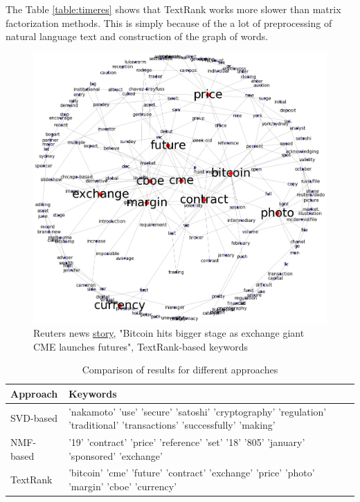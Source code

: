 \documentclass[a4paper]{article}
\begin{document}
The Table \ref{table:timeres} shows that TextRank works more slower than matrix factorization methods. This is simply because of the a lot of preprocessing of natural language text and construction of the graph of words.

\begin{center}
\begin{figure}[h!]
\includegraphics[scale=1]{textrank_example.png}
\caption{Reuters news \href{https://uk.reuters.com/article/us-bitcoin-futures/exchange-giant-cmes-bitcoin-futures-get-tepid-take-up-in-debut-idUKKBN1EB04N}{story}, "Bitcoin hits bigger stage as exchange giant CME launches futures", TextRank-based keywords}
\end{figure}
\end{center}

    \begin{table}[h!]
      \center
      \begin{tabular}{|p{3cm}|p{14cm}|}
      \hline
      Approach & Keywords \\
      \hline
      SVD-based & 'nakamoto' 'use' 'secure' 'satoshi' 'cryptography' 'regulation' 'traditional' 'transactions' 'successfully' 'making' \\
      \hline
      NMF-based & '19' 'contract' 'price' 'reference' 'set' '18' '805' 'january' 'sponsored' 'exchange' \\
      \hline
      TextRank & 'bitcoin' 'cme' 'future' 'contract' 'exchange' 'price' 'photo' 'margin' 'cboe' 'currency' \\
      \hline
      \end{tabular}
      \caption{Comparison of results for different approaches}
    \end{table}
\end{document}
